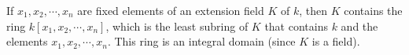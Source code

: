 If $x_1, x_2, \cdots, x_n$ are fixed elements of an extension field $K$ of $k$, then $K$ contains the ring $k[x_1, x_2, \cdots, x_n]$, which is the least subring of $K$ that contains $k$ and the elements $x_1, x_2, \cdots, x_n$. This ring is an integral domain (since $K$ is a field).
